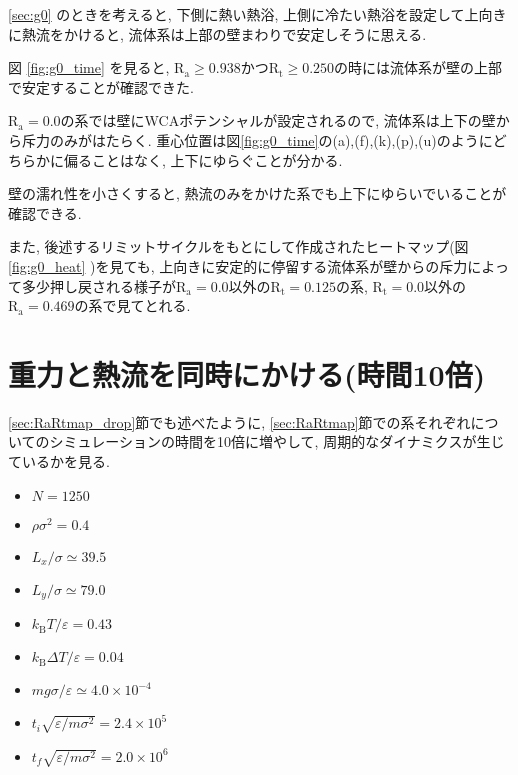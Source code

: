 

\ref{sec:g0} のときを考えると, 下側に熱い熱浴, 上側に冷たい熱浴を設定して上向きに熱流をかけると, 流体系は上部の壁まわりで安定しそうに思える.

図 \ref{fig:g0_time} を見ると, $\text{R}_\text{a} \ge 0.938 かつ \text{R}_\text{t} \ge 0.250$の時には流体系が壁の上部で安定することが確認できた.

$\text{R}_\text{a}=0.0$の系では壁にWCAポテンシャルが設定されるので, 流体系は上下の壁から斥力のみがはたらく. 重心位置は図\ref{fig:g0_time}の(a),(f),(k),(p),(u)のようにどちらかに偏ることはなく, 上下にゆらぐことが分かる.

壁の濡れ性を小さくすると, 熱流のみをかけた系でも上下にゆらいでいることが確認できる. 

また, 後述するリミットサイクルをもとにして作成されたヒートマップ(図 \ref{fig:g0_heat} )を見ても, 上向きに安定的に停留する流体系が壁からの斥力によって多少押し戻される様子が$\text{R}_\text{a}=0.0$以外の$\text{R}_\text{t}=0.125$の系, $\text{R}_\text{t}=0.0$以外の$\text{R}_\text{a}=0.469$の系で見てとれる. 

\section{重力と熱流を同時にかける(時間10倍)}\label{sec:RaRtmap10}

\ref{sec:RaRtmap_drop}節でも述べたように, \ref{sec:RaRtmap}節での系それぞれについてのシミュレーションの時間を10倍に増やして, 周期的なダイナミクスが生じているかを見る. 

\begin{itemize}
  \item $N = 1250$
  \item $\rho {\sigma}^2 = 0.4$
  \item $L_x / \sigma \simeq 39.5$
  \item $L_y / \sigma \simeq 79.0$
  \item $k_{\text{B}} T / \varepsilon = 0.43$
  \item $k_{\text{B}} \Delta T / \varepsilon = 0.04$
  \item $mg\sigma/\varepsilon \simeq 4.0 \times 10^{-4}$
  \item $t_i \sqrt{\varepsilon / m \sigma^2}= 2.4 \times 10^5$
  \item $t_f \sqrt{\varepsilon / m \sigma^2} = 2.0 \times 10^{6}$
\end{itemize}



